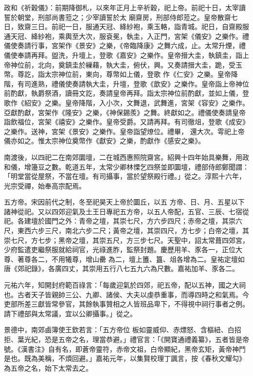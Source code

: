 \begin{pinyinscope}
 政和《祈穀儀》：前期降御札，以來年正月上辛祈穀，祀上帝。前祀十日，太宰讀誓於朝堂，刑部尚書蒞之；少宰讀誓於太
 廟齋房，刑部侍郎蒞之。皇帝散齋七日，致齋三日。前祀一日，服通天冠、絳紗袍，乘玉輅，詣青城。祀日，自齋殿服通天冠、絳紗袍，乘輿至大次，服袞冕，執圭，入正門，宮架《儀安》之樂作。禮儀使奏請行事，宮架作《景安》之樂，《帝臨降康》之舞六成，止。太常升煙，禮儀使奉請再拜。盥洗，升壇上，登歌《嘉安》之樂作。皇帝搢大圭，執鎮圭，詣上帝神位前，北向，奠鎮圭於繅藉，執大圭，俯伏，興。又奏請搢大圭，跪，受玉幣。尊訖，詣太宗神位前，東向，尊幣如上儀，登歌
 作《仁安》之樂。皇帝降階，有司進熟，禮儀使奏請執大圭，升壇，登歌《歆安》之樂作。皇帝詣上帝神位前酌獻，執爵祭酒，讀冊文訖，奏請皇帝再拜。詣太宗神位前酌獻，並如上儀，登歌作《紹安》之樂。皇帝降階，入小次，文舞退，武舞進，宮架《容安》之樂作。亞獻酌獻，宮架作《隆安》之樂，《神保錫羨》之舞。終獻如之。禮儀使奏請皇帝詣飲福位，宮架《禧安》之樂作。皇帝受爵。又請再拜。有司徹俎，登歌《成安》之樂作。送神，宮架《景安》之樂作。皇帝詣望燎位。禮畢，
 還大次。雩祀上帝儀亦如之。惟太宗神位奠幣作《獻安》之樂，酌獻作《感安之樂》。



 南渡後，以四祀二在南郊圜壇，二在城西惠照院齋宮。紹興十四年始具樂舞，用政和儀，增籩豆之數。乾道五年，太常少卿林慄乞四祭並即圜壇，禮部侍郎鄭聞謂：「明堂當從屋祭，不當在壇。有司攝事，當於望祭殿行禮。」從之。淳熙十六年，光宗受禪，始奉高宗配焉。



 五方帝。宋因前代之制，冬至祀昊天上帝於圜丘，以五
 方帝、日、月、五星以下諸神從祀。又以四郊迎氣及土王日專祀五方帝，以五人帝配，五官、三辰、七宿從祀。各建壇於國門之外：青帝之壇，其崇七尺，方六步四尺；赤帝之壇，其崇六尺，東西六步三尺，南北六步二尺；黃帝之壇，其崇四尺，方七步；白帝之壇，其崇七尺，方七步；黑帝之壇，其崇五尺，方三步七尺。天聖中，詔太常葺四郊宮，少府監遣吏繼祭服就給祠官，光祿進胙，監祭封題。慶歷用羊、豕各一，正位大尊、著尊各二，不用犧尊，增山罍
 為二，壇上簠、簋、俎各增為二。皇祐定壇如唐《郊祀錄》，各廣四丈，其崇用五行八七五九六為尺數。嘉祐加羊、豕各二。



 元祐六年，知開封府範百祿言：「每歲迎氣於四郊，祀五帝，配以五神，國之大祠也。古者天子皆親帥三公、九卿、諸侯、大夫以虔恭重事，而導四時之和氣焉。今吏部所差三獻皆常參官，其餘執事贊相之人皆班品卑下，不得視中祠行事者之例。請下禮部與太常議，宜以公卿攝事。」從之。



 景德中，南郊鹵簿使王欽若言：「五方帝位
 板如靈威仰、赤熛怒、含樞紐、白招拒、葉光紀，恐是五帝之名，理當恭避。」禮官言：「《開寶通禮義纂》，五者皆是帝號。《漢書注》自有名，即蒼帝靈符，赤帝文祖，白帝顯紀，黑帝玄矩，黃帝神鬥是也。既為美稱，不煩回避。」嘉祐元年，以集賢校理丁諷言，按《春秋文耀勾》為五帝之名，始下太常去之。




\end{pinyinscope}
